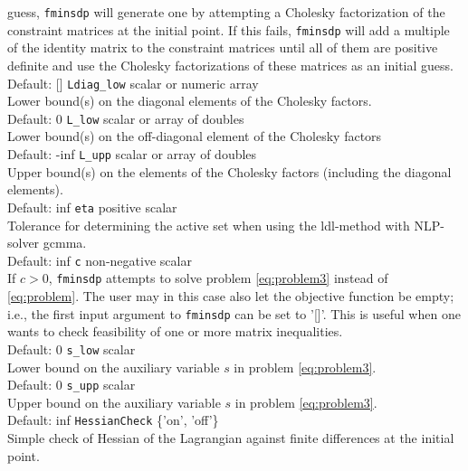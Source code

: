 \documentclass{article}
\begin{document}
guess, \texttt{fminsdp} will generate one by attempting a Cholesky factorization of the constraint matrices 
at the initial point. If this fails, \texttt{fminsdp} will add a multiple of the identity matrix to
the constraint matrices until all of them are positive definite and use the Cholesky factorizations of these
matrices as an initial guess. \\
Default: []
\vskip 2mm
\noindent \texttt{Ldiag\_low} \hskip 2cm  scalar or numeric array	\\
Lower bound(s) on the diagonal elements of the Cholesky factors. \\
Default: 0
\vskip 2mm
\noindent \texttt{L\_low} \hskip 2.75cm   scalar or array of doubles \\
Lower bound(s) on the off-diagonal element of the Cholesky factors \\
Default: -inf
\vskip 2mm
\noindent 
\texttt{L\_upp} \hskip 2.75cm  scalar or array of doubles \\
Upper bound(s) on the elements of the Cholesky factors (including the diagonal elements).\\
Default: inf
\vskip 2mm
\noindent 
\texttt{eta} \hskip 3.1cm  positive scalar  \\
Tolerance for determining the active set when using the ldl-method with NLP-solver gcmma.\\
Default: inf
\vskip 2mm
\noindent 
\texttt{c} \hskip 3.47cm  non-negative scalar    \\
If $c>0$, \texttt{fminsdp} attempts to solve problem \eqref{eq:problem3} instead of 
\eqref{eq:problem}. The user may in this case also let the objective function be empty; i.e., the first input argument to \texttt{fminsdp} can be set to '[]'. This is useful when one wants to check feasibility of one or more matrix inequalities. \\
Default: 0
\vskip 2mm
\noindent
\texttt{s\_low}   \hskip 2.8cm        scalar      \\
Lower bound on the auxiliary variable $s$ in problem \eqref{eq:problem3}.\\
Default: 0
\vskip 2mm
\noindent
\texttt{s\_upp}   \hskip 2.8cm        scalar      \\
Upper bound on the auxiliary variable $s$ in problem \eqref{eq:problem3}.\\
Default: inf
\vskip 2mm
\noindent
\texttt{HessianCheck} \hskip 1.4cm   \{'on', 'off'\} \\      
Simple check of Hessian of the Lagrangian against finite differences at the initial point. 
\end{document}
